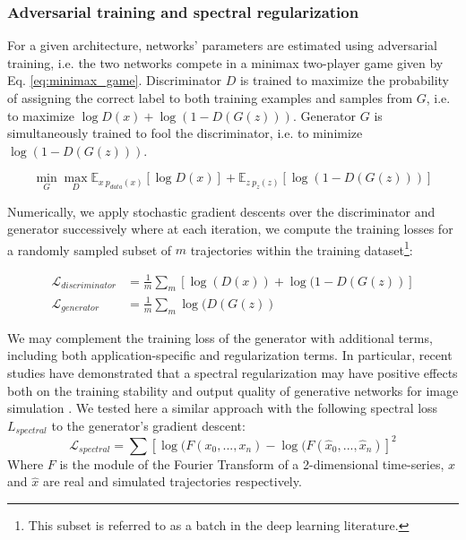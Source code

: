 \documentclass{article}
\begin{document}
\subsubsection{Adversarial training and spectral regularization}

For a given architecture, networks' parameters are estimated using adversarial training, i.e. the two networks compete in a minimax two-player game given by Eq. \ref{eq:minimax_game}. Discriminator $D$ is trained to maximize the probability of assigning the correct label to both training examples and samples from $G$, i.e. to maximize $\log D(x) + \log (1 -D(G(z)))$. Generator $G$ is simultaneously trained to fool the discriminator, i.e. to minimize $\log (1 - D(G(z)))$. 

\begin{equation}
\label{eq:minimax_game}
\min_G \max_D \mathbb{E}_{x ~ p_{data}(x)}[\log D(x)] + \mathbb{E}_{z ~ p_z(z)}[\log(1 - D(G(z)))]
\end{equation}

Numerically, we apply stochastic gradient descents over the discriminator and generator successively where at each iteration, we compute the training losses for a randomly sampled subset of $m$ trajectories within the training dataset\footnote{This subset is referred to as a batch in the deep learning literature.}:

\begin{equation}
\label{eq:loss}
\begin{aligned}
\mathcal{L}_{discriminator} & = \frac{1}{m} \sum_m [ \log(D(x)) + \log(1 - D(G(z))] \\
\mathcal{L}_{generator} & = \frac{1}{m} \sum_m \log(D(G(z))
\end{aligned}
\end{equation}

We may complement the training loss of the generator with additional terms, including both application-specific  \citep{ledig_photo-realistic_2017} and regularization \citep{durall_watch_2020} terms. In particular, recent studies have demonstrated that a spectral regularization may have positive effects both on the training stability and output quality of generative networks for image simulation \citep{durall_watch_2020}. We tested here a similar approach with the following spectral loss ${L}_{spectral}$ to the generator's gradient descent:
\begin{equation}
\label{eq:spectral}
\mathcal{L}_{spectral} = \sum  [\log(F(x_0, ..., x_n) - \log(F(\hat{x}_0, ..., \hat{x}_n)]^2
\end{equation}
Where $F$ is the module of the Fourier Transform of a 2-dimensional time-series, $x$ and $\hat{x}$ are real and simulated trajectories respectively.
\end{document}
